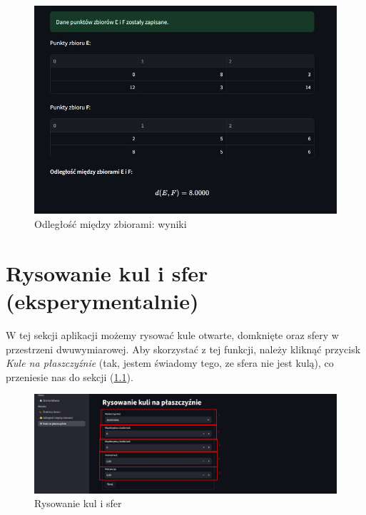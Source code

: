 \documentclass[article,11pt]{mwrep}
\begin{document}
\begin{figure}[H] 
    \centering
    \includegraphics[width=1\textwidth]{figure/Screenshot_7.jpg}
    \caption{Odległość między zbiorami: wyniki}\label{rys:ow}
\end{figure}

\chapter{Rysowanie kul i sfer (eksperymentalnie)}

W tej sekcji aplikacji możemy rysować kule otwarte, domknięte oraz sfery w przestrzeni dwuwymiarowej. Aby skorzystać z tej funkcji, należy kliknąć przycisk \textit{Kule na płaszczyźnie} (tak, jestem świadomy tego, ze sfera nie jest kulą), co przeniesie nas do sekcji (\ref{rys:rk}). 

\begin{figure}[H] 
    \centering
    \includegraphics[width=1\textwidth]{figure/Screenshot_8.jpg}
    \caption{Rysowanie kul i sfer}\label{rys:rk}
\end{figure}
\end{document}
